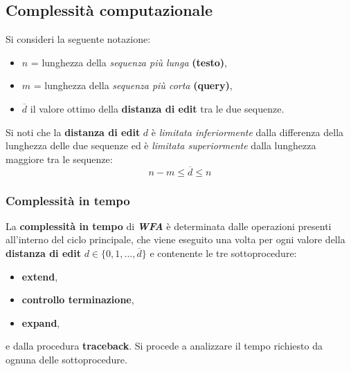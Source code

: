 \subsection{Complessità computazionale}
    Si consideri la seguente notazione:
    \begin{itemize}
        \item $n$ = lunghezza della \emph{sequenza più lunga} \textbf{(testo)},
        \item $m$ = lunghezza della \emph{sequenza più corta} \textbf{(query)},
        \item $\overline{d}$ il valore ottimo della \textbf{distanza di edit} tra le due sequenze.
    \end{itemize}
    Si noti che la \textbf{distanza di edit} $d$ è \emph{limitata inferiormente} dalla differenza della lunghezza delle due sequenze ed è \emph{limitata superiormente} dalla lunghezza maggiore tra le sequenze:
    \begin{equation}
        n - m \leq \overline{d} \leq n
    \label{equation:edit-dist_limit}
    \end{equation}

\subsubsection{Complessità in tempo}
    La \textbf{complessità in tempo} di \textbf{\textit{WFA}} è determinata dalle operazioni presenti all'interno del ciclo principale, che viene eseguito una volta per ogni valore della \textbf{distanza di edit} $d \in \{0, 1, ..., \overline{d}\}$ e contenente le tre sottoprocedure:
    \begin{itemize}
        \item \textbf{extend},
        \item \textbf{controllo terminazione},
        \item \textbf{expand},
    \end{itemize}
    e dalla procedura \textbf{traceback}. Si procede a analizzare il tempo richiesto da ognuna delle sottoprocedure.
